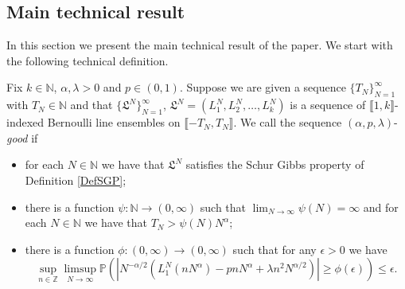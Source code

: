 \subsection{Main technical result}\label{Section2.3} In this section we present the main technical result of the paper. We start with the following technical definition.
\begin{definition}\label{Def1} Fix $k \in \mathbb{N}$, $\alpha, \lambda > 0$ and $p \in (0,1)$. Suppose we are given a sequence $\{ T_N \}_{N = 1}^\infty$ with $T_N \in \mathbb{N}$ and that $\{\mathfrak{L}^N\}_{N = 1}^\infty$, $\mathfrak{L}^N = (L^N_1, L^N_2, \dots, L^N_k)$ is a sequence of $\llbracket 1, k \rrbracket$-indexed Bernoulli line ensembles on $ \llbracket -T_N, T_N \rrbracket$. We call the sequence $(\alpha,p,\lambda)$-{\em good} if 
\begin{itemize}
\item for each $N \in \mathbb{N}$ we  have that $\mathfrak{L}^N$ satisfies the Schur Gibbs property of Definition \ref{DefSGP};  
\item there is a function $\psi: \mathbb{N} \rightarrow (0, \infty)$ such that $\lim_{N \rightarrow \infty} \psi(N) = \infty$ and for each $N \in \mathbb{N}$ we have that $ T_N > \psi(N)N^{\alpha}$;
\item  there is a function $\phi: (0, \infty) \rightarrow (0,\infty)$ such that for any $\epsilon > 0$ we have 
\begin{equation}\label{globalParabola}
 \sup_{n \in \mathbb{Z}} \limsup_{N \rightarrow \infty} \mathbb{P} \left( \left|N^{-\alpha/2}(L_1^N(n N^{\alpha}) - p n N^{\alpha} + \lambda n^2 N^{\alpha/2}) \right| \geq \phi(\epsilon) \right) \leq \epsilon.
\end{equation}
\end{itemize}
\end{definition}
